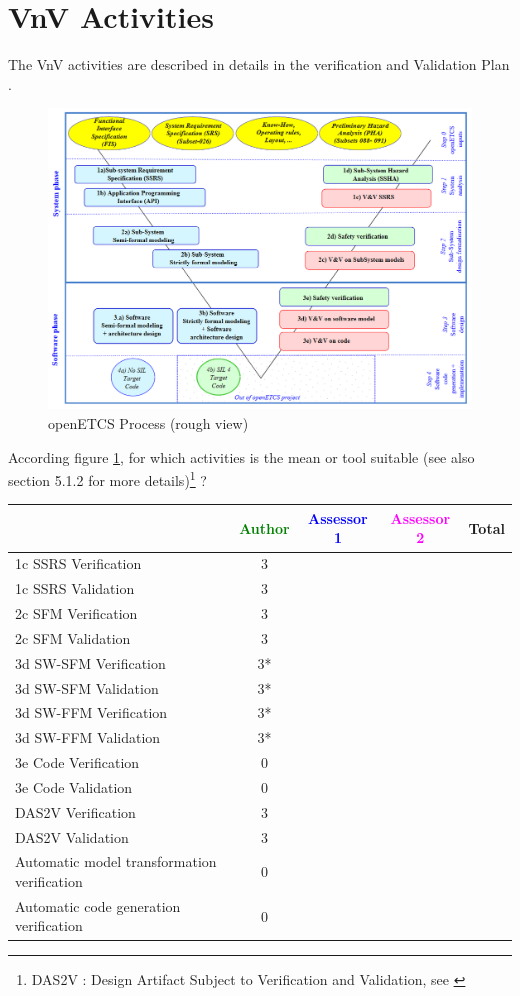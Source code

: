 \section{VnV Activities}

The VnV activities are described in details in the verification and Validation Plan  \citep{D4.1}.

\begin{figure}[htb]
  \centering
  \includegraphics[width=.9\textwidth]{images/ProcessOpenETCS-BeM.png}
  \caption{openETCS Process (rough view)}
  \label{fig:openETCSProcess}
\end{figure}

According figure \ref{fig:openETCSProcess}, for which activities is the mean or tool suitable (see also \citep{D4.1} section 5.1.2 for more details)\footnote{DAS2V : Design Artifact Subject to Verification and Validation, see \citep{D4.1}} ?


\begin{tabular}{|l | c | c | c | c|}
\hline
& \textcolor{green}{Author} & \textcolor{blue}{Assessor 1} & \textcolor{magenta}{Assessor 2} & Total \\
\hline 
1c SSRS Verification & 3& & &  \\
\hline
1c SSRS Validation & 3& & &  \\
\hline
2c SFM Verification & 3& & &  \\
\hline
2c SFM Validation & 3& & &  \\
\hline
3d SW-SFM Verification &3*& & &  \\
\hline
3d SW-SFM Validation & 3*& & &  \\
\hline
3d SW-FFM Verification & 3*& & &  \\
\hline
3d SW-FFM Validation & 3*& & &  \\
\hline
3e Code Verification &0 & & &  \\
\hline
3e Code Validation &0 & & &  \\
\hline
DAS2V Verification &3 & & &  \\
\hline
DAS2V Validation &3 & & &  \\
\hline
Automatic model transformation verification &0 & & &  \\
\hline
Automatic code generation verification &0 & & &  \\
\hline
\end{tabular}

